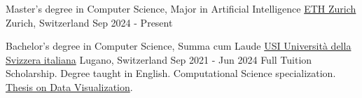 

\begin{cventries}

  \cventry
    {Master's degree in Computer Science, Major in Artificial Intelligence} %
    {\href{https://inf.ethz.ch/studies/master/master-cs-2020.html}{%
    ETH Zurich}} %
    {Zurich, Switzerland} %
    {Sep 2024 - Present} %
    {}
    
\vspace{-0.3cm}
  \cventry
    {Bachelor's degree in Computer Science, Summa cum Laude} %
    {\href{https://www.usi.ch/en/education/bachelor/informatics}{%
    USI Università della Svizzera italiana}} %
    {Lugano, Switzerland} %
    {Sep 2021 - Jun 2024} %
    {
    Full Tuition Scholarship. Degree taught in English.
    Computational Science specialization.
    \href{https://www.inf.usi.ch/faculty/lanza/teaching.html\#BScProjects}{%
    Thesis on Data Visualization}.
    }
    
\end{cventries}
